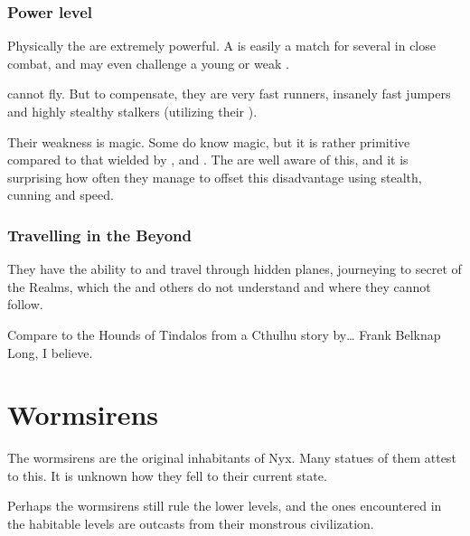 \subsubsection{Power level}
Physically the \vorcanths{} are extremely powerful. 
A \vorcanth{} is easily a match for several \resphain{} in close combat, and may even challenge a young or weak \dragon{}. 

\Vorcanths{} cannot fly. 
But to compensate, they are very fast runners, insanely fast jumpers and highly stealthy stalkers (utilizing their ). 

Their weakness is magic. 
Some \vorcanths{} do know magic, but it is rather primitive compared to that wielded by \dragons{}, \resphain{} and \quiljaaran{}. 
The \vorcanths{} are well aware of this, and it is surprising how often they manage to offset this disadvantage using stealth, cunning and speed. 





\subsubsection{Travelling in the Beyond}
They have the ability to  and travel through hidden planes, journeying to secret  of the Realms, which the \dragons{} and others do not understand and where they cannot follow. 

Compare to the Hounds of Tindalos from a Cthulhu story by\ldots{} Frank Belknap Long, I believe. 









\section{Wormsirens}
The wormsirens are the original inhabitants of Nyx. Many statues of them attest to this. It is unknown how they fell to their current state. 

Perhaps the wormsirens still rule the lower levels, and the ones encountered in the habitable levels are outcasts from their monstrous civilization. 























